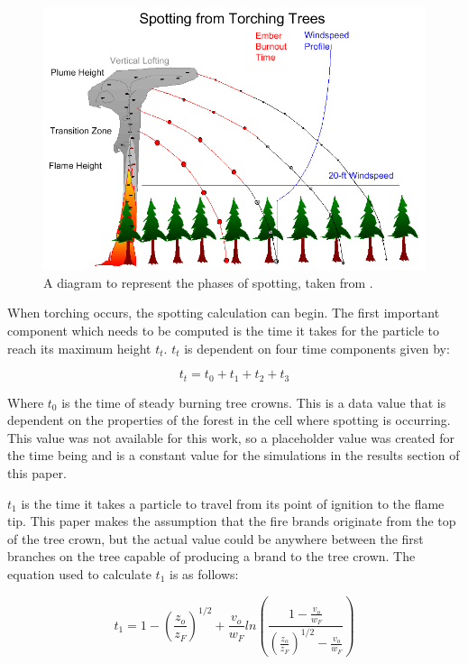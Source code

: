 \begin{figure}%
\centering
  \includegraphics[width=\textwidth]{figures/implementation/spotting_diagram.png}
  \caption{A diagram to represent the phases of spotting, taken from \cite{firebehaveref}.}
  \label{fig:spot_diagram}
\end{figure}

When torching occurs, the spotting calculation can begin. The first important component which needs to be computed is the time it takes for the particle to reach its maximum height $t_t$. $t_t$ is dependent on four time components given by: 

\begin{equation}
t_t = t_0 + t_1 + t_2 + t_3
\end{equation}

Where $t_0$ is the time of steady burning tree crowns. This is a data value that is dependent on the properties of the forest in the cell where spotting is occurring. This value was not available for this work, so a placeholder value was created for the time being and is a constant value for the simulations in the results section of this paper. 

$t_1$ is the time it takes a particle to travel from its point of ignition to the flame tip. This paper makes the assumption that the fire brands originate from the top of the tree crown, but the actual value could be anywhere between the first branches on the tree capable of producing a brand to the tree crown. The equation used to calculate $t_1$ is as follows: 

\begin{equation}
t_1 = 1 - (\frac{z_o}{z_F})^{1/2} + \frac{v_o}{w_F}ln(\frac{1-\frac{v_o}{w_F}}{(\frac{z_o}{z_F})^{1/2} - \frac{v_o}{w_F}})
\end{equation}

